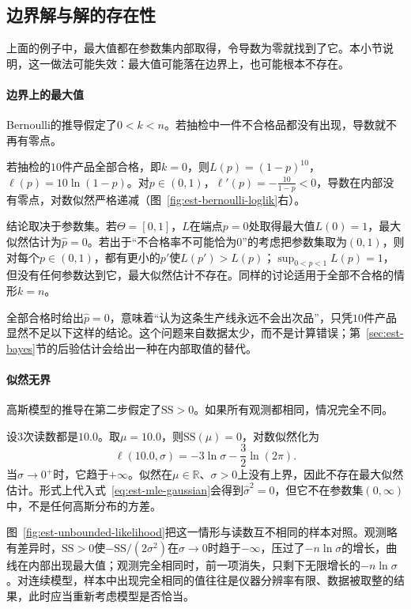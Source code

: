 \subsection{边界解与解的存在性}

上面的例子中，最大值都在参数集内部取得，令导数为零就找到了它。本小节说明，这一做法可能失效：最大值可能落在边界上，也可能根本不存在。

\paragraph{边界上的最大值}
Bernoulli的推导假定了$0<k<n$。若抽检中一件不合格品都没有出现，导数就不再有零点。

\begin{example}[全部合格]
\label{ex:est-mle-boundary}
若抽检的$10$件产品全部合格，即$k=0$，则$L(p)=(1-p)^{10}$，$\ell(p)=10\ln(1-p)$。对$p\in(0,1)$，$\ell'(p)=-\frac{10}{1-p}<0$，导数在内部没有零点，对数似然严格递减（图~\ref{fig:est-bernoulli-loglik}右）。

结论取决于参数集。若$\Theta=[0,1]$，$L$在端点$p=0$处取得最大值$L(0)=1$，最大似然估计为$\hat p=0$。若出于“不合格率不可能恰为$0$”的考虑把参数集取为$(0,1)$，则对每个$p\in(0,1)$，都有更小的$p'$使$L(p')>L(p)$；$\sup_{0<p<1}L(p)=1$，但没有任何参数达到它，最大似然估计不存在。同样的讨论适用于全部不合格的情形$k=n$。
\end{example}

全部合格时给出$\hat p=0$，意味着“认为这条生产线永远不会出次品”，只凭$10$件产品显然不足以下这样的结论。这个问题来自数据太少，而不是计算错误；第~\ref{sec:est-bayes}节的后验估计会给出一种在内部取值的替代。

\paragraph{似然无界}
高斯模型的推导在第二步假定了$\mathrm{SS}>0$。如果所有观测都相同，情况完全不同。

\begin{example}[全部观测相同]
\label{ex:est-mle-unbounded}
设$3$次读数都是$10.0$。取$\mu=10.0$，则$\mathrm{SS}(\mu)=0$，对数似然化为
\[
\ell(10.0,\sigma)=-3\ln\sigma-\frac32\ln(2\pi).
\]
当$\sigma\to0^+$时，它趋于$+\infty$。似然在$\mu\in\mathbb{R}$、$\sigma>0$上没有上界，因此不存在最大似然估计。形式上代入式~\eqref{eq:est-mle-gaussian}会得到$\hat\sigma^2=0$，但它不在参数集$(0,\infty)$中，不是任何高斯分布的方差。
\end{example}

图~\ref{fig:est-unbounded-likelihood}把这一情形与读数互不相同的样本对照。观测略有差异时，$\mathrm{SS}>0$使$-\mathrm{SS}/(2\sigma^2)$在$\sigma\to0$时趋于$-\infty$，压过了$-n\ln\sigma$的增长，曲线在内部出现最大值；观测完全相同时，前一项消失，只剩下无限增长的$-n\ln\sigma$。对连续模型，样本中出现完全相同的值往往是仪器分辨率有限、数据被取整的结果，此时应当重新考虑模型是否恰当。

